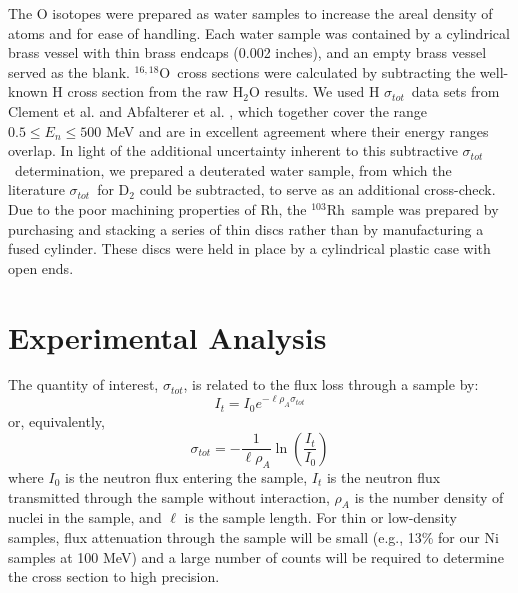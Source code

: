 \documentclass[twocolumn,secnumarabic,amssymb, nobibnotes, aps, prl,
superscriptaddress, nobalancelastpage, floatfix]{revtex4}
\newcommand{\tot}{\ensuremath{\sigma_{tot}}}
\newcommand{\oSixEight}{\ensuremath{^{16,18}}O}
\newcommand{\rhThree}{\ensuremath{^{103}}R\lowercase{h}}
\begin{document}
The O isotopes were prepared as water samples to increase the areal density
of atoms and for ease of handling. Each water sample was contained by a
cylindrical brass vessel with thin brass endcaps (0.002 inches), and an
empty brass vessel served as the blank. \oSixEight\
cross sections were calculated by
subtracting the well-known H cross section from the raw H$_{2}$O results.
We used H \tot\  data sets from Clement et al. \cite{Clement1972} and Abfalterer
et al. \cite{Abfalterer2001}, which together cover the range $0.5 \leq E_n \leq 500$ MeV
and are in excellent agreement where their energy ranges overlap. In light of
the additional uncertainty inherent to this subtractive \tot\ determination,
we prepared a deuterated water sample,
from which the literature \tot\ for D$_{2}$ could be subtracted, to serve as an additional
cross-check. Due to
the poor machining properties of Rh, the \rhThree\ sample
was prepared by purchasing and stacking a series of thin discs rather than by
manufacturing a fused cylinder. These discs were held in place
by a cylindrical plastic case with open ends.

\section{Experimental Analysis}
The quantity of interest, \tot, is related to the flux
loss through a sample by:
\begin{equation}
    I_{t} = I_{0}e^{-{\ell\rho_{A}\sigma_{tot}}}
\end{equation}
or, equivalently,
\begin{equation}
    \tot = -\frac{1}{\ell\rho_{A}}\ln\left(\frac{I_{t}}{I_{0}}\right)
\end{equation}
where $I_{0}$ is the neutron flux entering the sample, $I_{t}$ is the neutron
flux transmitted through the sample without interaction, $\rho_{A}$ is the number
density of nuclei in the sample, and $\ell$ is the sample length. For thin
or low-density samples, flux attenuation through the sample will be small
(e.g., 13\% for our Ni samples at 100 MeV) and a large number
of counts will be required to determine the cross section to high
precision.
\end{document}
